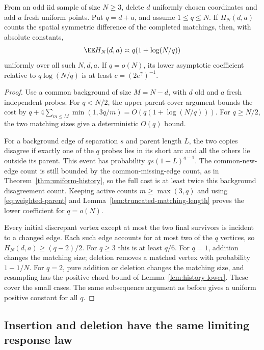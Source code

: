 \documentclass[11pt,letterpaper]{article}
\begin{document}
\begin{corollary}
\label{cor:mixed-history}
From an odd iid sample of size $N\ge3$, delete $d$ uniformly chosen
coordinates and add $a$ fresh uniform points. Put $q=d+a$, and
assume $1\le q\le N$. If $H_N(d,a)$ counts the spatial symmetric
difference of the completed matchings, then, with absolute constants,
\[
 \EE H_N(d,a)\asymp q(1+\log(N/q))
\]
uniformly over all such $N,d,a$. If $q=o(N)$, its lower asymptotic
coefficient relative to $q\log(N/q)$ is at least
$c=(2e^\gamma)^{-1}$.
\end{corollary}
\begin{proof}
Use a common background of size $M=N-d$, with $d$ old and $a$
fresh independent probes. For $q<N/2$, the upper parent-cover
argument bounds the cost by
$q+4\sum_{m\le M}\min(1,3q/m)=O(q(1+\log(N/q)))$.
For $q\ge N/2$, the two matching sizes give a deterministic $O(q)$
bound.

For a background edge of separation $s$ and parent length $L$,
the two copies disagree if exactly one of the $q$ probes lies
in its short arc and all the others lie outside its parent.
This event has probability $qs(1-L)^{q-1}$.
The common-new-edge count is still bounded by the common-missing-edge
count, as in Theorem~\ref{thm:uniform-history}, so the full cost is
at least twice this background disagreement count.
Keeping active counts $m\ge\max(3,q)$ and using
\eqref{eq:weighted-parent} and
Lemma~\ref{lem:truncated-matching-length} proves the lower
coefficient for $q=o(N)$.

Every initial discrepant vertex except at most the two final
survivors is incident to a changed edge. Each such edge accounts
for at most two of the $q$ vertices, so $H_N(d,a)\ge(q-2)/2$.
For $q\ge3$ this is at least $q/6$.
For $q=1$, addition changes the matching size; deletion removes a
matched vertex with probability $1-1/N$. For $q=2$, pure addition
or deletion changes the matching size, and resampling has the
positive chord bound of Lemma~\ref{lem:history-lower}.
These cover the small cases. The same subsequence argument as
before gives a uniform positive constant for all $q$.
\end{proof}

\subsection{Insertion and deletion have the same limiting response law}
\label{sec:edit-universality}
\end{document}
